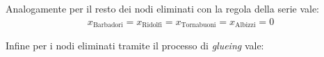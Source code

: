 \documentclass[11pt,largemargins]{homework}
\begin{document}
\begin{alphaparts}
  Analogamente per il resto dei nodi eliminati con la regola della serie vale:
  \begin{gather*}
    x_{\text{Barbadori}}=x_{\text{Ridolfi}}=x_{\text{Tornabuoni}}=x_{\text{Albizzi}}=0
  \end{gather*}

  Infine per i nodi eliminati tramite il processo di \textit{glueing} vale:
  \



\end{alphaparts}
  
    



  
\end{document}

